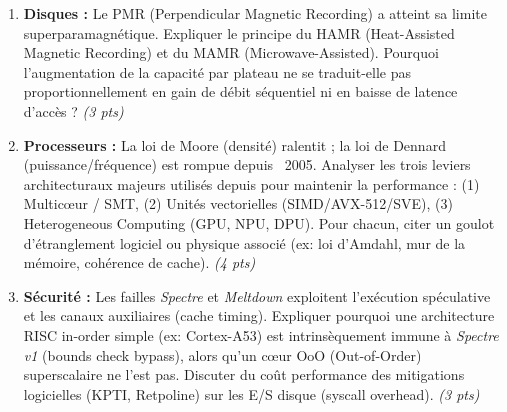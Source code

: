 \documentclass[11pt]{article}
\begin{document}
\begin{exercice}
\begin{enumerate}
    \item \textbf{Disques :} Le PMR (Perpendicular Magnetic Recording) a atteint sa limite superparamagnétique. Expliquer le principe du HAMR (Heat-Assisted Magnetic Recording) et du MAMR (Microwave-Assisted). Pourquoi l'augmentation de la capacité par plateau ne se traduit-elle pas proportionnellement en gain de débit séquentiel ni en baisse de latence d'accès ? \textit{(3 pts)}
    \item \textbf{Processeurs :} La loi de Moore (densité) ralentit ; la loi de Dennard (puissance/fréquence) est rompue depuis ~2005. Analyser les trois leviers architecturaux majeurs utilisés depuis pour maintenir la performance : (1) Multicœur / SMT, (2) Unités vectorielles (SIMD/AVX-512/SVE), (3) Heterogeneous Computing (GPU, NPU, DPU). Pour chacun, citer un goulot d'étranglement logiciel ou physique associé (ex: loi d'Amdahl, mur de la mémoire, cohérence de cache). \textit{(4 pts)}
    \item \textbf{Sécurité :} Les failles \textit{Spectre} et \textit{Meltdown} exploitent l'exécution spéculative et les canaux auxiliaires (cache timing). Expliquer pourquoi une architecture RISC in-order simple (ex: Cortex-A53) est intrinsèquement immune à \textit{Spectre v1} (bounds check bypass), alors qu'un cœur OoO (Out-of-Order) superscalaire ne l'est pas. Discuter du coût performance des mitigations logicielles (KPTI, Retpoline) sur les E/S disque (syscall overhead). \textit{(3 pts)}
\end{enumerate}
\end{exercice}
\end{document}
